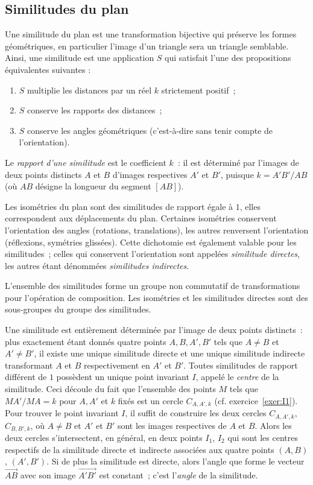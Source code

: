 \subsection{Similitudes du plan}

Une similitude du plan est une transformation bijective qui préserve les formes géométriques, en particulier l'image d'un triangle sera un triangle semblable. Ainsi, une similitude est une application $S$ qui satisfait l'une des propositions équivalentes suivantes :
\begin{enumerate}
\item $S$ multiplie les distances par un réel $k$ strictement positif~;
\item $S$ conserve les rapports des distances~;
\item $S$ conserve les angles géométriques (c'est-à-dire sans tenir compte de l'orientation).
\end{enumerate}
Le \emph{rapport d'une similitude} est le coefficient $k$~: il est déterminé par l'images de deux points distincts $A$ et $B$ d'images respectives $A'$ et $B'$, puisque $k=A'B'/AB$ (où $AB$ désigne la longueur du segment $[AB]$).

Les isométries du plan sont des similitudes de rapport égale à $1$, elles correspondent aux déplacements du plan. Certaines isométries conservent l'orientation des angles (rotations, translations), les autres renversent l'orientation (réflexions, symétries glissées). Cette dichotomie est également valable pour les similitudes~; celles qui conservent l'orientation sont appelées \emph{similitude directes}, les autres étant dénommées \emph{similitudes indirectes}. 

L'ensemble des similitudes forme un groupe non commutatif de transformations pour l'opération de composition. Les isométries et les similitudes directes sont des sous-groupes du groupe des similitudes. 

Une similitude est entièrement déterminée par l'image de deux points distincts~: plus exactement étant donnés quatre points $A,B,A',B'$ tels que $A\neq B$ et $A' \neq B'$, il existe une unique similitude directe et une unique similitude indirecte transformant $A$ et $B$ respectivement en $A'$ et $B'$. Toutes similitudes de rapport différent de $1$ possèdent un unique point invariant $I$, appelé le \emph{centre} de la similitude. Ceci découle du fait que l'ensemble des points $M$ tels que $MA'/MA=k$ pour $A,A'$ et $k$ fixés est un cercle $C_{A,A',k}$ (cf. exercice~\ref{exer:I1}). Pour trouver le point invariant $I$, il suffit de construire les deux cercles $C_{A,A',k}$, $C_{B,B',k}$, où $A \neq B$ et $A'$ et $B'$ sont les images respectives de $A$ et $B$. Alors les deux cercles s'intersectent, en général, en deux points $I_1$, $I_2$ qui sont les centres respectifs de la similitude directe et indirecte associées aux quatre points $(A,B)$, $(A',B')$. Si de plus la similitude est directe, alors l'angle que forme le vecteur $\stackrel{\longrightarrow}{AB}$ avec son image $\stackrel{\longrightarrow}{A'B'}$ est constant~; c'est l'\emph{angle} de la similitude.  

